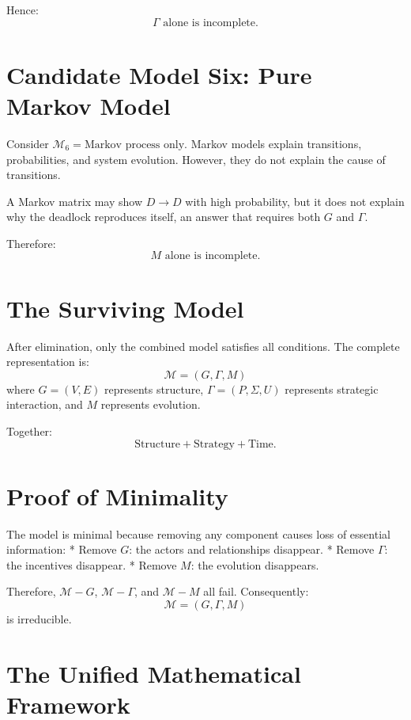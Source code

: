 \documentclass[11pt,openany]{book}
\theoremstyle{plain}
\theoremstyle{definition}
\begin{document}
Hence:
\[
\boxed{
\Gamma \text{ alone is incomplete.}
}
\]

\section*{Candidate Model Six: Pure Markov Model}

Consider \(\mathcal{M}_6 = \text{Markov process only}\). Markov models explain transitions, probabilities, and system evolution. However, they do not explain the cause of transitions. 

A Markov matrix may show \(D \to D\) with high probability, but it does not explain why the deadlock reproduces itself, an answer that requires both \(G\) and \(\Gamma\).

Therefore:
\[
\boxed{
M \text{ alone is incomplete.}
}
\]

\section*{The Surviving Model}

After elimination, only the combined model satisfies all conditions. The complete representation is:
\[
\boxed{
\mathcal{M} = (G, \Gamma, M)
}
\]
where \(G = (V, E)\) represents structure, \(\Gamma=(P,\Sigma,U)\) represents strategic interaction, and \(M\) represents evolution.

Together:
\[
\boxed{
\text{Structure} + \text{Strategy} + \text{Time}.
}
\]

\section*{Proof of Minimality}

The model is minimal because removing any component causes loss of essential information:
* Remove \(G\): the actors and relationships disappear.
* Remove \(\Gamma\): the incentives disappear.
* Remove \(M\): the evolution disappears.

Therefore, \(\mathcal{M} - G\), \(\mathcal{M} - \Gamma\), and \(\mathcal{M} - M\) all fail. Consequently:
\[
\boxed{
\mathcal{M} = (G, \Gamma, M)
}
\]
is irreducible.


\section{The Unified Mathematical Framework}
\end{document}
